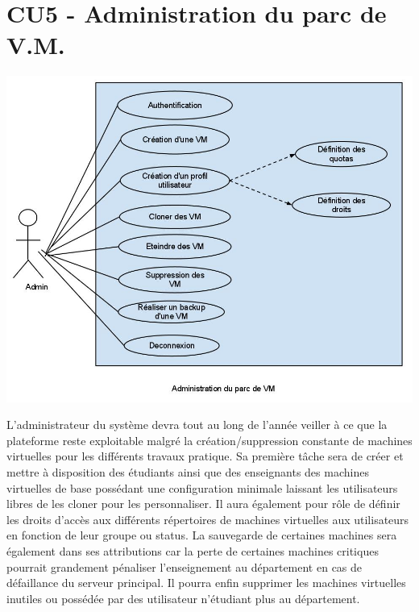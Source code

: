 \section{CU5 - Administration du parc de V.M.}

\includegraphics[scale=0.4]{CU5.jpg}

L’administrateur du système devra tout au long de l’année veiller à ce que la plateforme reste exploitable malgré la création/suppression constante de machines virtuelles pour les différents travaux pratique. Sa première tâche sera de créer et mettre à disposition des étudiants ainsi que des enseignants des machines virtuelles de base possédant une configuration minimale laissant les utilisateurs libres de les cloner pour les personnaliser. Il aura également pour rôle de définir les droits d’accès aux différents répertoires de machines virtuelles aux utilisateurs en fonction de leur groupe ou status. 
La sauvegarde de certaines machines sera également dans ses attributions car la perte de certaines machines critiques pourrait grandement pénaliser l’enseignement au département en cas de défaillance du serveur principal.
Il pourra enfin supprimer les machines virtuelles inutiles ou possédée par des utilisateur n’étudiant plus au département.